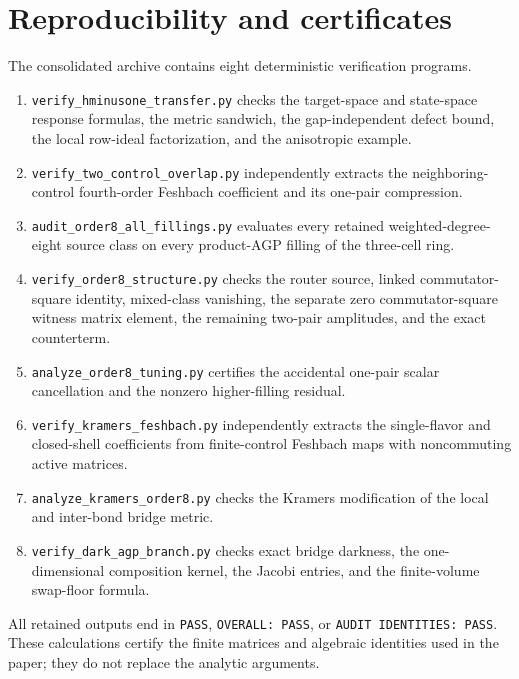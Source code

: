 \documentclass[11pt]{article}
\theoremstyle{definition}
\theoremstyle{remark}
\begin{document}
\section{Reproducibility and certificates}
\label{app:repro}

The consolidated archive contains eight deterministic verification programs.
\begin{enumerate}
\item \texttt{verify\_hminusone\_transfer.py} checks the target-space and
state-space response formulas, the metric sandwich, the gap-independent defect
bound, the local row-ideal factorization, and the anisotropic example.
\item \texttt{verify\_two\_control\_overlap.py} independently extracts the
neighboring-control fourth-order Feshbach coefficient and its one-pair
compression.
\item \texttt{audit\_order8\_all\_fillings.py} evaluates every retained
weighted-degree-eight source class on every product-AGP filling of the
three-cell ring.
\item \texttt{verify\_order8\_structure.py} checks the router source, linked
commutator-square identity, mixed-class vanishing, the separate zero
commutator-square witness matrix element, the remaining two-pair amplitudes, and
the exact counterterm.
\item \texttt{analyze\_order8\_tuning.py} certifies the accidental one-pair
scalar cancellation and the nonzero higher-filling residual.
\item \texttt{verify\_kramers\_feshbach.py} independently extracts the
single-flavor and closed-shell coefficients from finite-control Feshbach maps
with noncommuting active matrices.
\item \texttt{analyze\_kramers\_order8.py} checks the Kramers modification of
the local and inter-bond bridge metric.
\item \texttt{verify\_dark\_agp\_branch.py} checks exact bridge darkness, the
one-dimensional composition kernel, the Jacobi entries, and the finite-volume
swap-floor formula.
\end{enumerate}
All retained outputs end in \texttt{PASS}, \texttt{OVERALL: PASS}, or
\texttt{AUDIT IDENTITIES: PASS}.  These calculations certify the finite
matrices and algebraic identities used in the paper; they do not replace the
analytic arguments.
\end{document}
